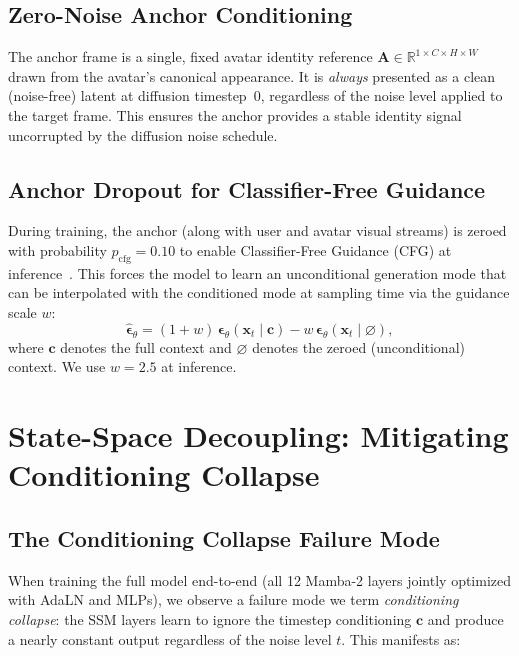 \documentclass[12pt,letterpaper]{report}
\begin{document}
\subsection{Zero-Noise Anchor Conditioning}

The anchor frame is a single, fixed avatar identity reference
$\mathbf{A} \in \mathbb{R}^{1 \times C \times H \times W}$ drawn from the
avatar's canonical appearance. It is \emph{always} presented as a clean
(noise-free) latent at diffusion timestep~0, regardless of the noise level
applied to the target frame. This ensures the anchor provides a stable
identity signal uncorrupted by the diffusion noise schedule. %

\subsection{Anchor Dropout for Classifier-Free Guidance}

During training, the anchor (along with user and avatar visual streams) is
zeroed with probability $p_{\mathrm{cfg}} = 0.10$ to enable Classifier-Free
Guidance (CFG) at inference~\cite{ho2021classifierfree}. This forces the model to learn an unconditional
generation mode that can be interpolated with the conditioned mode at sampling
time via the guidance scale $w$:
%
\begin{equation}
    \hat{\boldsymbol{\epsilon}}_\theta = (1 + w)\,\boldsymbol{\epsilon}_\theta(\mathbf{x}_t \mid \mathbf{c})
        - w\,\boldsymbol{\epsilon}_\theta(\mathbf{x}_t \mid \varnothing),
\end{equation}
%
where $\mathbf{c}$ denotes the full context and $\varnothing$ denotes the
zeroed (unconditional) context. We use $w = 2.5$ at inference. %

\section{State-Space Decoupling: Mitigating Conditioning Collapse}\label{sec:decoupling}

\subsection{The Conditioning Collapse Failure Mode}

When training the full model end-to-end (all 12 Mamba-2 layers jointly
optimized with AdaLN and MLPs), we observe a failure mode we term
\emph{conditioning collapse}: the SSM layers learn to ignore the timestep
conditioning $\mathbf{c}$ and produce a nearly constant output regardless of
the noise level $t$. This manifests as: %
\end{document}
